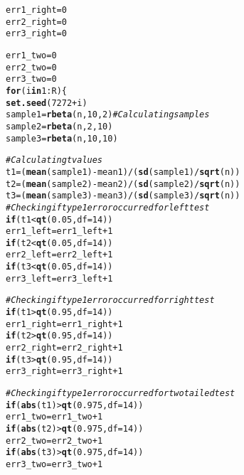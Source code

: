 \documentclass{article}\usepackage[]{graphicx}\usepackage[]{xcolor}
\makeatletter
\newcommand{\hlnum}[1]{\textcolor[rgb]{0.686,0.059,0.569}{#1}}%
\newcommand{\hlcom}[1]{\textcolor[rgb]{0.678,0.584,0.686}{\textit{#1}}}%
\newcommand{\hlopt}[1]{\textcolor[rgb]{0,0,0}{#1}}%
\newcommand{\hldef}[1]{\textcolor[rgb]{0.345,0.345,0.345}{#1}}%
\newcommand{\hlkwa}[1]{\textcolor[rgb]{0.161,0.373,0.58}{\textbf{#1}}}%
\newcommand{\hlkwb}[1]{\textcolor[rgb]{0.69,0.353,0.396}{#1}}%
\newcommand{\hlkwc}[1]{\textcolor[rgb]{0.333,0.667,0.333}{#1}}%
\newcommand{\hlkwd}[1]{\textcolor[rgb]{0.737,0.353,0.396}{\textbf{#1}}}%
\newenvironment{kframe}{%
 \def\at@end@of@kframe{}%
 \ifinner\ifhmode%
  \def\at@end@of@kframe{\end{minipage}}%
  \begin{minipage}{\columnwidth}%
 \fi\fi%
 \def\FrameCommand##1{\hskip\@totalleftmargin \hskip-\fboxsep
 \colorbox{shadecolor}{##1}\hskip-\fboxsep
     \hskip-\linewidth \hskip-\@totalleftmargin \hskip\columnwidth}%
 \MakeFramed {\advance\hsize-\width
   \@totalleftmargin\z@ \linewidth\hsize
   \@setminipage}}%
 {\par\unskip\endMakeFramed%
 \at@end@of@kframe}
\newenvironment{knitrout}{}{} %
\makeatother
\begin{document}
\begin{enumerate}
\begin{enumerate}
\begin{knitrout}
\begin{kframe}
\begin{alltt}
\hldef{err1_right}\hlkwb{=}\hlnum{0}
\hldef{err2_right}\hlkwb{=}\hlnum{0}
\hldef{err3_right}\hlkwb{=}\hlnum{0}

\hldef{err1_two}\hlkwb{=}\hlnum{0}
\hldef{err2_two}\hlkwb{=}\hlnum{0}
\hldef{err3_two}\hlkwb{=}\hlnum{0}
\hlkwa{for}\hldef{(i} \hlkwa{in} \hlnum{1}\hlopt{:}\hldef{R)\{}
  \hlkwd{set.seed}\hldef{(}\hlnum{7272}\hlopt{+}\hldef{i)}
  \hldef{sample1} \hlkwb{=} \hlkwd{rbeta}\hldef{(n,} \hlnum{10}\hldef{,} \hlnum{2}\hldef{)} \hlcom{#Calculating samples}
  \hldef{sample2} \hlkwb{=} \hlkwd{rbeta}\hldef{(n,} \hlnum{2}\hldef{,} \hlnum{10}\hldef{)}
  \hldef{sample3} \hlkwb{=} \hlkwd{rbeta}\hldef{(n,} \hlnum{10}\hldef{,} \hlnum{10}\hldef{)}

  \hlcom{#Calculating t values}
  \hldef{t1} \hlkwb{=} \hldef{(}\hlkwd{mean}\hldef{(sample1)}\hlopt{-}\hldef{mean1)}\hlopt{/}\hldef{(}\hlkwd{sd}\hldef{(sample1)}\hlopt{/}\hlkwd{sqrt}\hldef{(n))}
  \hldef{t2} \hlkwb{=} \hldef{(}\hlkwd{mean}\hldef{(sample2)}\hlopt{-}\hldef{mean2)}\hlopt{/}\hldef{(}\hlkwd{sd}\hldef{(sample2)}\hlopt{/}\hlkwd{sqrt}\hldef{(n))}
  \hldef{t3} \hlkwb{=} \hldef{(}\hlkwd{mean}\hldef{(sample3)}\hlopt{-}\hldef{mean3)}\hlopt{/}\hldef{(}\hlkwd{sd}\hldef{(sample3)}\hlopt{/}\hlkwd{sqrt}\hldef{(n))}
  \hlcom{#Checking if type 1 error occurred for left test}
  \hlkwa{if} \hldef{(t1}\hlopt{<}\hlkwd{qt}\hldef{(}\hlnum{0.05}\hldef{,} \hlkwc{df}\hldef{=}\hlnum{14}\hldef{))}
    \hldef{err1_left}\hlkwb{=}\hldef{err1_left}\hlopt{+}\hlnum{1}
  \hlkwa{if} \hldef{(t2}\hlopt{<}\hlkwd{qt}\hldef{(}\hlnum{0.05}\hldef{,} \hlkwc{df}\hldef{=}\hlnum{14}\hldef{))}
    \hldef{err2_left}\hlkwb{=}\hldef{err2_left}\hlopt{+}\hlnum{1}
  \hlkwa{if} \hldef{(t3}\hlopt{<}\hlkwd{qt}\hldef{(}\hlnum{0.05}\hldef{,} \hlkwc{df}\hldef{=}\hlnum{14}\hldef{))}
    \hldef{err3_left}\hlkwb{=}\hldef{err3_left}\hlopt{+}\hlnum{1}


  \hlcom{#Checking if type 1 error occurred for right test}
  \hlkwa{if} \hldef{(t1}\hlopt{>}\hlkwd{qt}\hldef{(}\hlnum{0.95}\hldef{,} \hlkwc{df}\hldef{=}\hlnum{14}\hldef{))}
    \hldef{err1_right}\hlkwb{=}\hldef{err1_right}\hlopt{+}\hlnum{1}
  \hlkwa{if} \hldef{(t2}\hlopt{>}\hlkwd{qt}\hldef{(}\hlnum{0.95}\hldef{,} \hlkwc{df}\hldef{=}\hlnum{14}\hldef{))}
    \hldef{err2_right}\hlkwb{=}\hldef{err2_right}\hlopt{+}\hlnum{1}
  \hlkwa{if} \hldef{(t3}\hlopt{>}\hlkwd{qt}\hldef{(}\hlnum{0.95}\hldef{,} \hlkwc{df}\hldef{=}\hlnum{14}\hldef{))}
    \hldef{err3_right}\hlkwb{=}\hldef{err3_right}\hlopt{+}\hlnum{1}


  \hlcom{#Checking if type 1 error occurred for two tailed test}
  \hlkwa{if} \hldef{(}\hlkwd{abs}\hldef{(t1)}\hlopt{>}\hlkwd{qt}\hldef{(}\hlnum{0.975}\hldef{,} \hlkwc{df}\hldef{=}\hlnum{14}\hldef{))}
    \hldef{err1_two}\hlkwb{=}\hldef{err1_two}\hlopt{+}\hlnum{1}
  \hlkwa{if} \hldef{(}\hlkwd{abs}\hldef{(t2)}\hlopt{>}\hlkwd{qt}\hldef{(}\hlnum{0.975}\hldef{,} \hlkwc{df}\hldef{=}\hlnum{14}\hldef{))}
    \hldef{err2_two}\hlkwb{=}\hldef{err2_two}\hlopt{+}\hlnum{1}
  \hlkwa{if} \hldef{(}\hlkwd{abs}\hldef{(t3)}\hlopt{>}\hlkwd{qt}\hldef{(}\hlnum{0.975}\hldef{,} \hlkwc{df}\hldef{=}\hlnum{14}\hldef{))}
    \hldef{err3_two}\hlkwb{=}\hldef{err3_two}\hlopt{+}\hlnum{1}


\end{alltt}
\end{kframe}
\end{knitrout}
\end{enumerate}
\end{enumerate}
\end{document}
